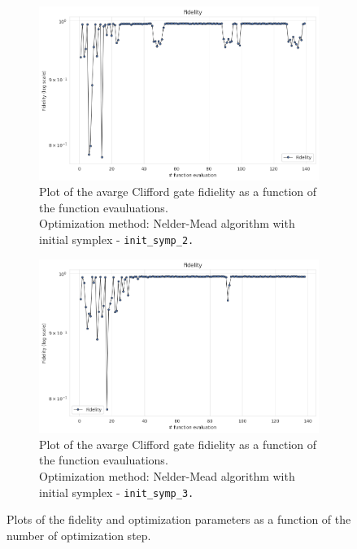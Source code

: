 \begin{figure}[h!]
    \vspace{0.5cm}

    \begin{subfigure}[t]{0.45\textwidth}
        \includegraphics[width=\textwidth]{figures/png/RB_optimization/NM/InitialSymplex/20241113_181711/complete.png }
        \caption{Plot of the avarge Clifford gate fidielity as a function of the function evauluations.\\
                Optimization method: Nelder-Mead algorithm with initial symplex - \tt{init\_symp\_2}.}
        \label{NM_true_fig:}
    \end{subfigure}
    \hfill
    \begin{subfigure}[t]{0.45\textwidth}
        \includegraphics[width=\textwidth]{figures/png/RB_optimization/NM/InitialSymplex/20241113_200745/complete.png}
        \caption{Plot of the avarge Clifford gate fidielity as a function of the function evauluations.\\
                Optimization method: Nelder-Mead algorithm with initial symplex - \tt{init\_symp\_3}.}
        \label{NM_true_fig:}
    \end{subfigure}

    \caption{Plots of the fidelity and optimization parameters as a function of the number of optimization step.}
    \label{fig:complete}
\end{figure}

